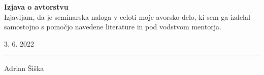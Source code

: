 \documentclass[12pt]{letter}
\begin{document}
\Large
\textbf{Izjava o avtorstvu} \\
  \normalsize
Izjavljam, da je seminarska naloga v celoti moje avorsko delo, ki sem ga izdelal samostojno s pomočjo
navedene literature in pod vodstvom mentorja. \\


\begin{minipage}{.5\linewidth}
  3. 6. 2022
\end{minipage}
\hfill
\begin{minipage}{4cm}
  \raggedleft
  \hrule
  \vspace{1mm}
  Adrian Šiška
\end{minipage}
\end{document}
